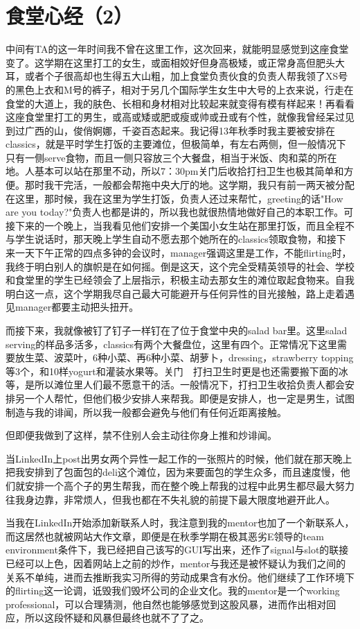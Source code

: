 \documentclass[12pt]{book}
\begin{document}
\section{食堂心经（2）}
\label{sec-41-2}
中间有TA的这一年时间我不曾在这里工作，这次回来，就能明显感觉到这座食堂变了。这学期在这里打工的女生，或面相姣好但身高极矮，或正常身高但肥头大耳，或者个子很高却也生得五大山粗，加上食堂负责伙食的负责人帮我领了XS号的黑色上衣和M号的裤子，相对于另几个国际学生女生中大号的上衣来说，行走在食堂的大道上，我的肤色、长相和身材相对比较起来就变得有模有样起来！再看看这座食堂里打工的男生，或高或矮或肥或瘦或帅或丑或有个性，就像我曾经呆过见到过广西的山，俊俏婀娜，千姿百态起来。我记得13年秋季时我主要被安排在classics，就是平时学生打饭的主要滩位，但极简单，有左右两侧，但一般情况下只有一侧serve食物，而且一侧只容放三个大餐盘，相当于米饭、肉和菜的所在地。人基本可以站在那里不动，所以7：30pm关门后收拾打扫卫生也极其简单和方便。那时我干完活，一般都会帮拖中央大厅的地。这学期，我只有前一两天被分配在这里，那时候，我在这里为学生打饭，负责人还过来帮忙，greeting的话"How are you today?"负责人也都是讲的，所以我也就很热情地做好自己的本职工作。可接下来的一个晚上，当我看见他们安排一个美国小女生站在那里打饭，而且全程不与学生说话时，那天晚上学生自动不愿去那个她所在的classics领取食物，和接下来一天下午正常的四点多钟的会议时，manager强调这里是工作，不能flirting时，我终于明白别人的旗帜是在如何摇。倒是这天，这个完全受精英领导的社会、学校和食堂里的学生已经领会了上层指示，积极主动去那女生的滩位取起食物来。自我明白这一点，这个学期我尽自己最大可能避开与任何异性的目光接触，路上走着遇见manager都要主动把头扭开。

而接下来，我就像被钉了钉子一样钉在了位于食堂中央的salad bar里。这里salad serving的样品多活多，classics有两个大餐盘位，这里有四个。正常情况下这里需要放生菜、波菜叶，6种小菜、再6种小菜、胡萝卜，dressing，strawberry topping等3个，和10样yogurt和灌装水果等。关门　打扫卫生时更是也还需要搬下面的冰等，是所以滩位里人们最不愿意干的活。一般情况下，打扫卫生收拾负责人都会安排另一个人帮忙，但他们极少安排人来帮我。即便是安排人，也一定是男生，试图制造与我的诽闻，所以我一般都会避免与他们有任何近距离接触。

但即便我做到了这样，禁不住别人会主动往你身上推和炒诽闻。

当LinkedIn上post出男女两个异性一起工作的一张照片的时候，他们就在那天晚上把我安排到了包面包的deli这个滩位，因为来要面包的学生众多，而且速度慢，他们就安排一个高个子的男生帮我，而在整个晚上帮我的过程中此男生都尽最大努力往我身边靠，非常烦人，但我也都在不失礼貌的前提下最大限度地避开此人。

当我在LinkedIn开始添加新联系人时，我注意到我的mentor也加了一个新联系人，而这居然也就被网站大作文章，即便是在秋季学期在极其恶劣E领导的team environment条件下，我已经把自己该写的GUI写出来，还作了signal与slot的联接已经可以上色，因着网站上之前的炒作，mentor与我还是被怀疑认为我们之间的关系不单纯，进而去推断我实习所得的劳动成果含有水份。他们继续了工作环境下的flirting这一论调，诋毁我们毁坏公司的企业文化。我的mentor是一个working professional，可以合理猜测，他自然也能够感觉到这股风暴，进而作出相对回应，所以这段怀疑和风暴但最终也就不了了之。
\end{document}
